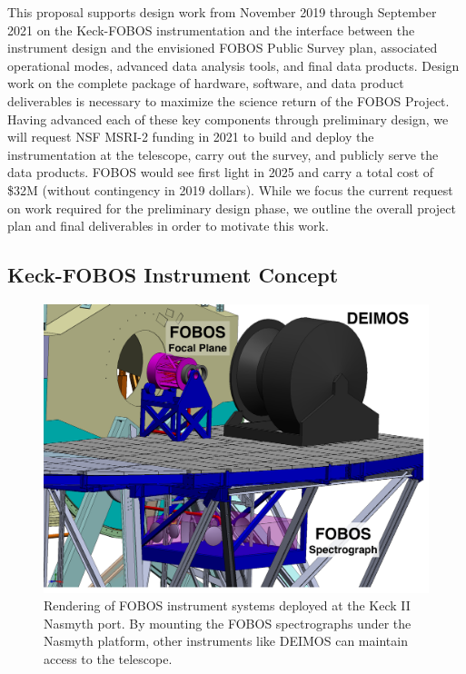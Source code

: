 \documentclass[oneside,11pt]{amsart}
\newcommand{\comment}[2][todo]{{\color{#1}[[{\bf #2}]]}}
\begin{document}
This proposal supports design work from November 2019 through September 2021 on the Keck-FOBOS instrumentation and the
interface between the instrument design and the envisioned FOBOS Public Survey plan, associated operational modes,
advanced data analysis tools, and final data products.  Design work on the complete package of hardware, software, and
data product deliverables is necessary to maximize the science return of the FOBOS Project.  Having advanced each of
these key components through preliminary design, we will request NSF MSRI-2 funding in 2021 to build and deploy the
instrumentation at the telescope, carry out the survey, and publicly serve the data products.  FOBOS would see first
light in 2025 and carry a total cost of \$32M (without contingency in 2019 dollars).  While we focus the current
request on work required for the preliminary design phase, we outline the overall project plan and final deliverables
in order to motivate this work.

\subsection{Keck-FOBOS Instrument Concept}
\label{sec:concept}
\noindent \comment{1 page}

\begin{figure}[h!]
 \vskip -0.1in
 \includegraphics[width=\textwidth]{FOBOSatKeck_v1.pdf}
 \caption{\small Rendering of FOBOS instrument systems deployed at the Keck II Nasmyth port.  By mounting the FOBOS spectrographs under the Nasmyth platform, other instruments like DEIMOS can maintain access to the telescope.}\label{fig:layout}
\end{figure}
\end{document}
